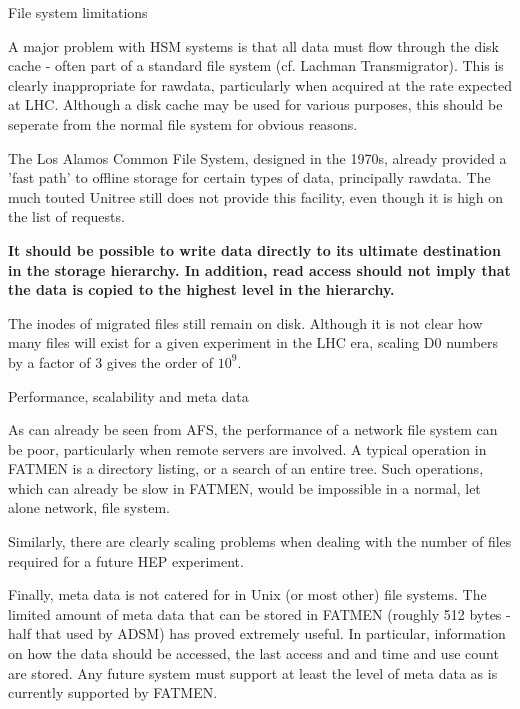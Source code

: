 \begin{slide}
\begin{center}File system limitations\end{center}

A major problem with HSM systems is that all data must flow
through the disk cache - often part of a standard file system (cf.
Lachman Transmigrator). This is clearly inappropriate for rawdata,
particularly when acquired at the rate expected at LHC. Although
a disk cache may be used for various purposes, this should be
seperate from the normal file system for obvious reasons.

The Los Alamos Common File System, designed in the 1970s, already
provided a 'fast path' to offline storage for certain types of
data, principally rawdata. The much touted Unitree still does not
provide this facility, even though it is high on the list of 
requests.

{\bf It should be possible to write data directly to its ultimate destination
in the storage hierarchy. In addition, read access should not imply
that the data is copied to the highest level in the hierarchy.}

The inodes of migrated files still remain on disk. Although it is not
clear how many files will exist for a given experiment in the LHC era,
scaling D0 numbers by a factor of 3 gives the order of $10^9$.

\end{slide}

\begin{slide}
\begin{center}Performance, scalability and meta data\end{center}

As can already be seen from AFS, the performance of a network
file system can be poor, particularly when remote servers
are involved. A typical operation in FATMEN is a directory
listing, or a search of an entire tree. Such operations,
which can already be slow in FATMEN, would be impossible
in a normal, let alone network, file system.

Similarly, there are clearly scaling problems when dealing
with the number of files required for a future HEP experiment.

Finally, meta data is not catered for in Unix (or most other)
file systems. The limited amount of meta data that can be
stored in FATMEN (roughly 512 bytes - half that used by ADSM)
has proved extremely useful. In particular, information on how
the data should be accessed, the last access and and time
and use count are stored. Any future system must support at
least the level of meta data as is currently supported by FATMEN.
\end{slide}


